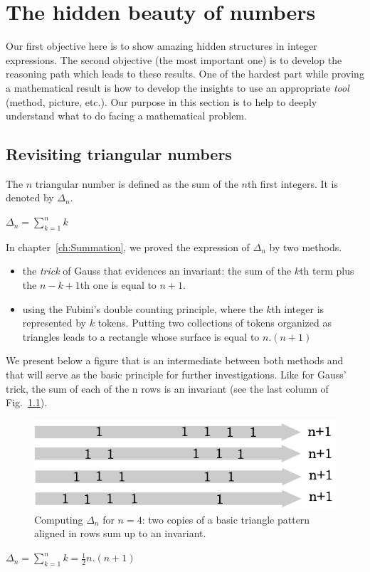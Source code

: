 
\chapter{The hidden beauty of numbers}
\label{Appendix:Tetra}

Our first objective here is to show amazing hidden structures in integer expressions.
The second objective (the most important one) is to develop the reasoning path which leads to these results.
One of the hardest part while proving a mathematical result is how to develop the insights to use an appropriate \textit{tool} (method, picture, etc.).
Our purpose in this section is to help to deeply understand what to do facing a mathematical problem.


\section{Revisiting triangular numbers}

The $n$ triangular number is defined as the sum of the $n$th first integers.
It is denoted by $\Delta_n$.

$\Delta_n =  \sum_{k=1}^{n} k$

In chapter~\ref{ch:Summation}, we proved the expression of $\Delta_n$ by two methods.
\begin{itemize}
\item the \textit{trick} of Gauss that evidences an invariant: the sum of the $k$th term plus the $n-k+1$th one
is equal to $n+1$. 
\item using the Fubini's double counting principle, where the $k$th integer is represented by $k$ tokens.
Putting two collections of tokens organized as triangles leads to a rectangle whose surface is equal to $n.(n+1)$
\end{itemize}
We present below a figure that is an intermediate between both methods and that will serve as the basic principle for further investigations.
Like for Gauss' trick, the sum of each of the n rows is an invariant (see the last column of Fig.~\ref{fig:Tetrahedral2}). 
\begin{figure}[h]
\begin{center}
        \includegraphics[scale=0.4]{FiguresArithmetic/appTetrahedral2}
        \caption{Computing $\Delta_n$ for $n=4$: two copies of a basic triangle pattern aligned in rows sum up to an invariant.}
        \label{fig:Tetrahedral2}
\end{center}
\end{figure}
$\Delta_n =  \sum_{k=1}^{n} k = \frac{1}{2}n.(n+1)$


